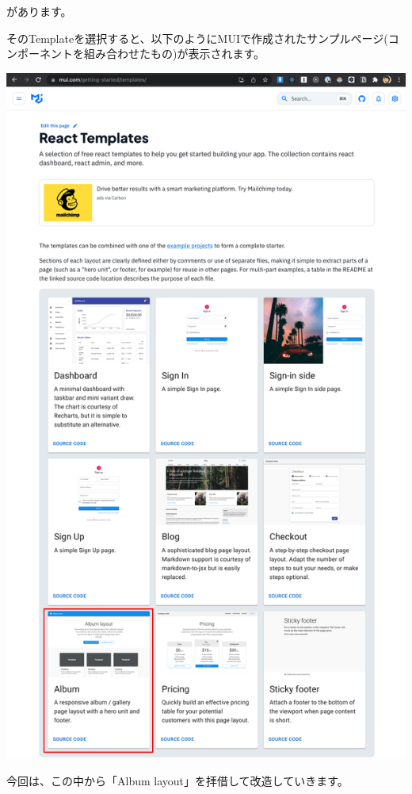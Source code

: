 があります。

そのTemplateを選択すると、以下のようにMUIで作成されたサンプルページ(コンポーネントを組み合わせたもの)が表示されます。

\begin{reviewimage}%
\includegraphics[width=0.5\maxwidth]{./images/03-todo-with-react/mui004-templates.png}%
\label{image:03-todo-with-react:mui004-templates}
\end{reviewimage}

今回は、この中から「Album layout」を拝借して改造していきます。



